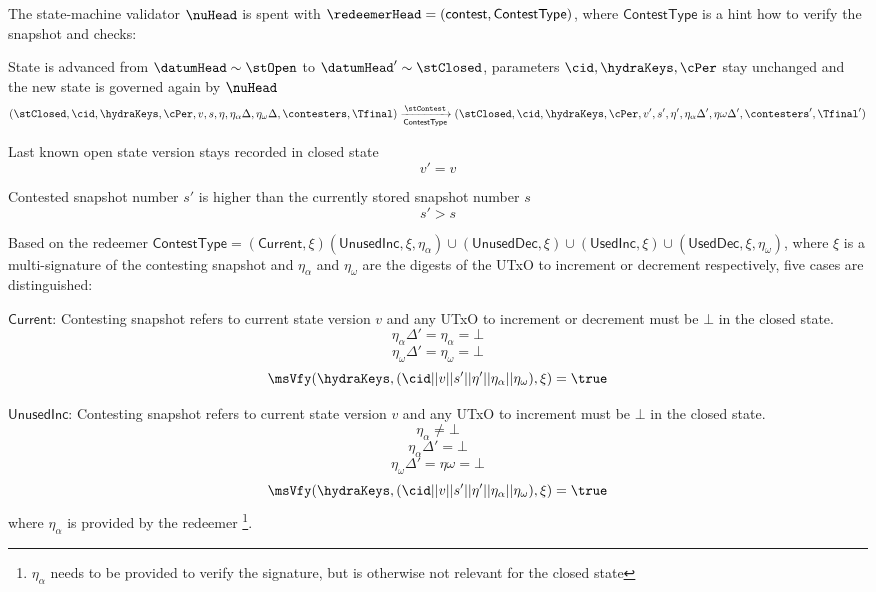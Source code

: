 \noindent The state-machine validator $\nuHead$ is spent with
$\redeemerHead = (\mathsf{contest}, \mathsf{ContestType})$, where
$\mathsf{ContestType}$ is a hint how to verify the snapshot and checks:
\begin{menumerate}
  \item State is advanced from $\datumHead \sim \stOpen$ to
  $\datumHead' \sim \stClosed$, parameters $\cid,\hydraKeys,\cPer$
  stay unchanged and the new state is governed again by $\nuHead$
  \[
	(\stClosed,\cid,\hydraKeys,\cPer,v,s,\eta,\eta_\alpha\Delta,\eta_\omega\Delta,\contesters,\Tfinal) \xrightarrow[\mathsf{ContestType}]{\stContest} (\stClosed,\cid,\hydraKeys,\cPer,v',s',\eta',\eta_\alpha\Delta',\eta\omega\Delta',\contesters',\Tfinal')
  \]

  \item Last known open state version stays recorded in closed state
  \[
	v' = v
  \]

  \item Contested snapshot number $s'$ is higher than the currently stored snapshot number $s$
  \[
	s' > s
  \]
  \item Based on the redeemer $\mathsf{ContestType} = (\mathsf{Current}, \xi) (\mathsf{UnusedInc}, \xi, \eta_\alpha) \cup (\mathsf{UnusedDec}, \xi) \cup (\mathsf{UsedInc}, \xi)  \cup (\mathsf{UsedDec}, \xi, \eta_\omega)$, where $\xi$ is a multi-signature of the contesting snapshot and $\eta_\alpha$ and $\eta_\omega$ are the digests of the UTxO to increment or decrement respectively, five cases are distinguished:

  \begin{menumerate}
	\item $\mathsf{Current}$: Contesting snapshot refers to current state version $v$ and any UTxO to increment or decrement must be $\bot$ in the closed state.
	  \[
		\eta_\alpha\Delta' = \eta_\alpha =  \bot
	  \]
	  \[
		\eta_\omega\Delta' = \eta_\omega =  \bot
	  \]
	  \[
		\msVfy(\hydraKeys,(\cid || v || s' || \eta' || \eta_\alpha || \eta_\omega),\xi) = \true
	  \]
	\item $\mathsf{UnusedInc}$: Contesting snapshot refers to current state version $v$ and any UTxO to increment must be $\bot$ in the closed state.
	  \[
	    \eta_\alpha  \neq \bot
	  \]
	  \[
	    \eta_\alpha\Delta' = \bot
	  \]
	  \[
		\eta_\omega\Delta' = \eta\omega = \bot
	  \]
	  \[
		\msVfy(\hydraKeys,(\cid || v || s' || \eta' || \eta_\alpha || \eta_\omega),\xi) = \true
	  \]
	  where $\eta_\alpha$ is provided by the redeemer \footnote{$\eta_\alpha$ needs to be provided to verify the signature, but is otherwise not relevant for the closed state}.


\end{menumerate}
\end{menumerate}
